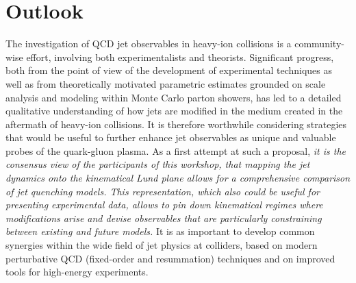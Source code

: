 
\section{Outlook}
\label{sec:outlook}

The investigation of QCD jet observables in heavy-ion collisions is a community-wise effort, involving both experimentalists and theorists. 
Significant progress, both from the point of view of the development of experimental techniques as well as from theoretically motivated parametric estimates grounded on scale analysis and modeling within Monte Carlo parton showers, has led to a detailed qualitative understanding of how jets are modified in the medium created in the aftermath of heavy-ion collisions.
It is therefore worthwhile considering 
strategies that would be useful to further enhance jet observables as unique and valuable probes of the quark-gluon plasma.
As a first attempt at such a proposal, 
\emph{it is the consensus view of the participants of this workshop, that mapping the jet dynamics onto the kinematical Lund plane allows for a comprehensive comparison of jet quenching models.
This representation, which also could be useful for presenting experimental data, allows to pin down kinematical regimes where modifications arise and devise observables that are particularly constraining between existing and future models.}
It is as important to develop common synergies within the wide field of jet physics at colliders, based on modern perturbative QCD (fixed-order and resummation) techniques and on improved tools for high-energy experiments.

